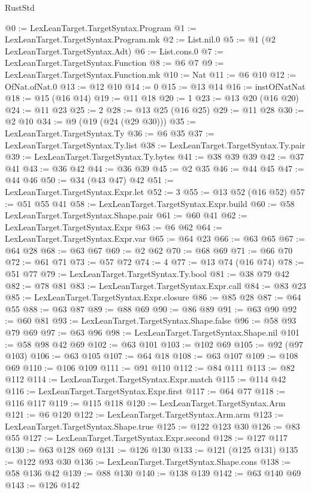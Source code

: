 \begin{lexlean}{RustStd}
\begin{coremodule}
@0 := LexLeanTarget.TargetSyntax.Program
@1 := LexLeanTarget.TargetSyntax.Program.mk
@2 := List.nil.{0}
@5 := @1 (@2 LexLeanTarget.TargetSyntax.Adt)
@6 := List.cons.{0}
@7 := LexLeanTarget.TargetSyntax.Function
@8 := @6 @7
@9 := LexLeanTarget.TargetSyntax.Function.mk
@10 := Nat
@11 := @6 @10
@12 := OfNat.ofNat.{0}
@13 := @12 @10
@14 := 0
@15 := @13 @14
@16 := instOfNatNat
@18 := @15 (@16 @14)
@19 := @11 @18
@20 := 1
@23 := @13 @20 (@16 @20)
@24 := @11 @23
@25 := 2
@28 := @13 @25 (@16 @25)
@29 := @11 @28
@30 := @2 @10
@34 := @9 (@19 (@24 (@29 @30)))
@35 := LexLeanTarget.TargetSyntax.Ty
@36 := @6 @35
@37 := LexLeanTarget.TargetSyntax.Ty.list
@38 := LexLeanTarget.TargetSyntax.Ty.pair
@39 := LexLeanTarget.TargetSyntax.Ty.bytes
@41 := @38 @39 @39
@42 := @37 @41
@43 := @36 @42
@44 := @36 @39
@45 := @2 @35
@46 := @44 @45
@47 := @44 @46
@50 := @34 (@43 @47) @42
@51 := LexLeanTarget.TargetSyntax.Expr.let
@52 := 3
@55 := @13 @52 (@16 @52)
@57 := @51 @55 @41
@58 := LexLeanTarget.TargetSyntax.Expr.build
@60 := @58 LexLeanTarget.TargetSyntax.Shape.pair
@61 := @60 @41
@62 := LexLeanTarget.TargetSyntax.Expr
@63 := @6 @62
@64 := LexLeanTarget.TargetSyntax.Expr.var
@65 := @64 @23
@66 := @63 @65
@67 := @64 @28
@68 := @63 @67
@69 := @2 @62
@70 := @68 @69
@71 := @66 @70
@72 := @61 @71
@73 := @57 @72
@74 := 4
@77 := @13 @74 (@16 @74)
@78 := @51 @77
@79 := LexLeanTarget.TargetSyntax.Ty.bool
@81 := @38 @79 @42
@82 := @78 @81
@83 := LexLeanTarget.TargetSyntax.Expr.call
@84 := @83 @23
@85 := LexLeanTarget.TargetSyntax.Expr.closure
@86 := @85 @28
@87 := @64 @55
@88 := @63 @87
@89 := @88 @69
@90 := @86 @89
@91 := @63 @90
@92 := @60 @81
@93 := LexLeanTarget.TargetSyntax.Shape.false
@96 := @58 @93 @79 @69
@97 := @63 @96
@98 := LexLeanTarget.TargetSyntax.Shape.nil
@101 := @58 @98 @42 @69
@102 := @63 @101
@103 := @102 @69
@105 := @92 (@97 @103)
@106 := @63 @105
@107 := @64 @18
@108 := @63 @107
@109 := @108 @69
@110 := @106 @109
@111 := @91 @110
@112 := @84 @111
@113 := @82 @112
@114 := LexLeanTarget.TargetSyntax.Expr.match
@115 := @114 @42
@116 := LexLeanTarget.TargetSyntax.Expr.first
@117 := @64 @77
@118 := @116 @117
@119 := @115 @118
@120 := LexLeanTarget.TargetSyntax.Arm
@121 := @6 @120
@122 := LexLeanTarget.TargetSyntax.Arm.arm
@123 := LexLeanTarget.TargetSyntax.Shape.true
@125 := @122 @123 @30
@126 := @83 @55
@127 := LexLeanTarget.TargetSyntax.Expr.second
@128 := @127 @117
@130 := @63 @128 @69
@131 := @126 @130
@133 := @121 (@125 @131)
@135 := @122 @93 @30
@136 := LexLeanTarget.TargetSyntax.Shape.cons
@138 := @58 @136 @42
@139 := @88 @130
@140 := @138 @139
@142 := @63 @140 @69
@143 := @126 @142

\end{coremodule}
\end{lexlean}
